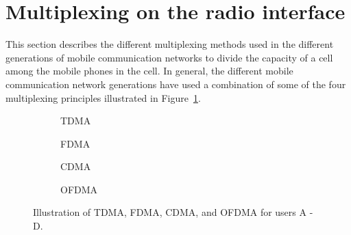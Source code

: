 \section{Multiplexing on the radio interface}
This section describes the different multiplexing methods used in the different generations of mobile communication networks to divide the capacity of a cell among the mobile phones in the cell. In general, the different mobile communication network generations have used a combination of some of the four multiplexing principles illustrated in Figure~\ref{fig:tdma_fdma_cdma_ofdma}.
\begin{figure}[htbp]
\centering
\begin{subfigure}[t][][b]{.21\textwidth}
\centering
{}
\caption{TDMA}
\end{subfigure}\hspace{3cm}
\begin{subfigure}[t][][b]{.21\textwidth}
\centering
{}
\caption{FDMA}
\end{subfigure}

\vspace{.5cm}
\begin{subfigure}[t][][b]{.24\textwidth}
\centering
{}
\caption{CDMA}
\end{subfigure}\hspace{3cm}
\begin{subfigure}[t][][b]{.21\textwidth}
\centering
{}
\caption{OFDMA}
\end{subfigure}
\caption{\label{fig:tdma_fdma_cdma_ofdma}Illustration of TDMA, FDMA, CDMA, and OFDMA for users A - D.}
\end{figure}
